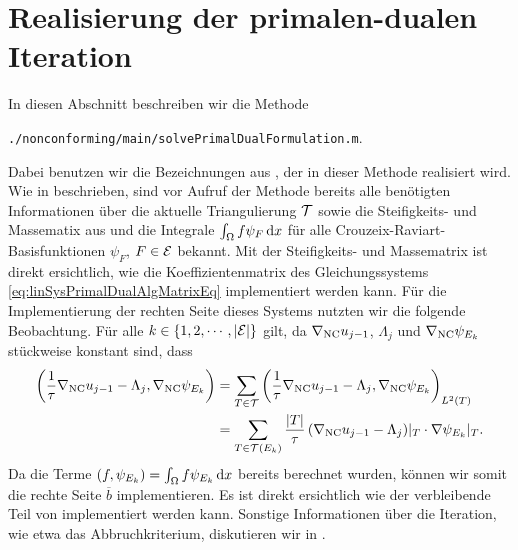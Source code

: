 \section{Realisierung der primalen-dualen Iteration}
\label{sec:implementationPrimalDualIteration}
In diesen Abschnitt beschreiben wir die Methode
\begin{center}
  \texttt{./nonconforming/main/solvePrimalDualFormulation.m}.
\end{center}
Dabei benutzen wir die Bezeichnungen aus , der
in dieser Methode realisiert wird.
Wie in  beschrieben, sind vor Aufruf der Methode bereits
alle benötigten Informationen über die aktuelle Triangulierung $\mathcal{T}$
sowie die Steifig\-keits- und Massematix aus 
und die Integrale $\int_\Omega f\psi_F\,\mathrm{d}x$ für alle
Crouzeix-Raviart-Basisfunktionen $\psi_F$, $F\in\mathcal{E}$ bekannt.
Mit der Steifigkeits- und Massematrix ist direkt ersichtlich,
wie die Koeffizientenmatrix des Gleichungssystems
\eqref{eq:linSysPrimalDualAlgMatrixEq} implementiert werden kann.
Für die Implementierung der rechten Seite dieses Systems nutzten wir die
folgende Beobachtung.
Für alle $k\in\{1,2,\cdots,|\mathcal{E}|\}$ gilt, da $\nabla_\textup{NC} u_{j-1}$,
$\Lambda_j$ und $\nabla_\textup{NC} \psi_{E_k}$ stückweise konstant sind, dass
\begin{align*}
  \left(\frac{1}{\tau}\nabla_\textup{NC} u_{j-1}-\Lambda_j,\nabla_\textup{NC}\psi_{E_k}\right)
  &=
  \sum_{T\in\mathcal{T}}
  \left(\frac{1}{\tau}\nabla_\textup{NC} u_{j-1}-\Lambda_j,
  \nabla_\textup{NC}\psi_{E_k}\right)_{L^2(T)}\\
  &=
  \sum_{T\in\mathcal{T}(E_k)}
  \frac{|T|}{\tau}\left(\nabla_\textup{NC} u_{j-1}-\Lambda_j\right)\!|_T\cdot
  \nabla\psi_{E_k}|_T.
\end{align*}
Da die Terme $\left(f,\psi_{E_k}\right)=\int_\Omega f\psi_{E_k}\,\mathrm{d}x$ bereits
berechnet wurden, können wir somit die rechte Seite $\overline b$
implementieren.
Es ist direkt ersichtlich wie der verbleibende Teil von
 implementiert werden kann.
Sonstige Informationen über die Iteration, wie etwa das Abbruchkriterium,
diskutieren wir in .

